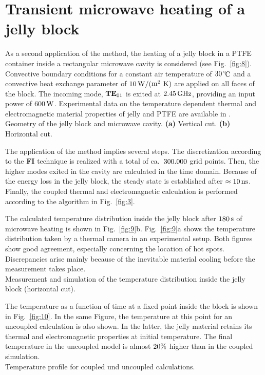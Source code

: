 \documentclass[twocolumn]{IEEEtran}
\begin{document}
\section{Transient microwave heating of a jelly block}
As a second application of the method, the heating of a jelly
block in a PTFE container inside a rectangular microwave cavity
is considered (see Fig.~\ref{fig:8}). Convective boundary conditions
for a constant air temperature of $\nmbr{30}\celcius$ and a convective
heat exchange parameter of $\nmbr{10}\watt/(\m^2\kelvin)$ are applied
on all faces of the block. The incoming mode, ${\bf TE}_{01}$ is exited
at $\nmbr{2.45}\GHz$, providing an input power of $\nmbr{600}\watt$.
Experimental data on the temperature dependent thermal and electromagnetic
material properties of jelly and PTFE are available in \cite{Ma}.
\befig[htb]
\centering
\mbox{\epsfxsize=85mm} \\[-5pt]
\caption{Geometry of the jelly block and microwave cavity. {\bf (a)}
Vertical cut. {\bf (b)} Horizontal cut.}
\label{fig:8}
\enfig

The application of the method implies several steps. The discretization
according to the {\bf FI} technique is realized with a total of ca.\
$\nmbr{300.000}$ grid points. Then, the higher modes exited in the cavity
are calculated in the time domain. Because of the energy loss in the
jelly block, the steady state is established after $\approx\nmbr{10}\nano$.
Finally, the coupled thermal and electromagnetic calculation is performed
according to the algorithm in Fig.~\ref{fig:3}.

The calculated temperature distribution inside the jelly block
after $180\mathop{\rm s}\nolimits$ of microwave heating is shown in Fig.~\ref{fig:9}b.
Fig.~\ref{fig:9}a shows the temperature distribution taken by
a thermal camera in an experimental setup. Both figures show good
agreement, especially concerning the location of hot spots.
Discrepancies arise mainly because of the inevitable material
cooling before the measurement takes place.
\befig[htb]
\centering
\mbox{\epsfxsize=85mm} \\[-5pt]
\caption{Measurement and simulation of the temperature distribution
inside the jelly block (horizontal cut).}
\label{fig:9}
\enfig

The temperature as a function of time at a fixed point inside
the block is shown in Fig.~\ref{fig:10}. In the same Figure, the
temperature at this point for an uncoupled calculation is also shown.
In the latter, the jelly material retains its thermal and electromagnetic
properties at initial temperature. The final temperature in the uncoupled
model is almost $\nmbr{20}\%$ higher than in the coupled simulation.
\befig[htb]
\centering
\mbox{\epsfxsize=62mm} \\[-5pt]
\caption{Temperature profile for coupled und uncoupled calculations.}
\label{fig:10}
\enfig
\end{document}
